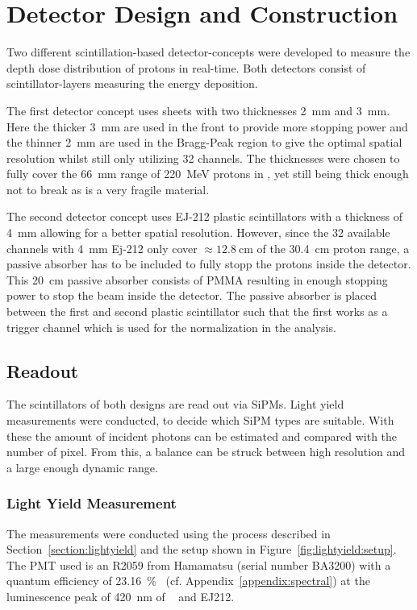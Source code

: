 \chapter{Detector Design and Construction}\label{chapter:setup}
Two different scintillation-based detector-concepts were developed to measure the depth dose distribution of protons in real-time.
Both detectors consist of scintillator-layers measuring the energy deposition.

The first detector concept uses  sheets with two thicknesses \SI{2}{\mm} and \SI{3}{\mm}.
Here the thicker \SI{3}{\mm} are used in the front to provide more stopping power and the thinner \SI{2}{\mm} are used in the Bragg-Peak region to give the optimal spatial resolution whilst still only utilizing 32 channels.
The thicknesses were chosen to fully cover the \SI{66}{\mm} range of \SI{220}{\mega\electronvolt} protons in , yet still being thick enough not to break as  is a very fragile material.

The second detector concept uses EJ-212 plastic scintillators with a thickness of \SI{4}{\mm} allowing for a better spatial resolution.
However, since the 32 available channels with \SI{4}{\mm} Ej-212 only cover $\approx \SI{12.8}{\centi\meter}$ of the \SI{30.4}{\centi\meter} proton range, a passive absorber has to be included to fully stopp the protons inside the detector.
This \SI{20}{\centi\meter} passive absorber consists of PMMA resulting in enough stopping power to stop the beam inside the detector.
The passive absorber is placed between the first and second plastic scintillator such that the first works as a trigger channel which is used for the normalization in the analysis.

\section{Readout}\label{section:readout}
The scintillators of both designs are read out via SiPMs.
Light yield measurements were conducted, to decide which SiPM types are suitable.
With these the amount of incident photons can be estimated and compared with the number of pixel.
From this, a balance can be struck between high resolution and a large enough dynamic range.
 
\subsection{Light Yield Measurement}
The measurements were conducted using the process described in Section~\ref{section:lightyield} and the setup shown in Figure~\ref{fig:lightyield:setup}.
The PMT used is an R2059 from Hamamatsu (serial number BA3200) with a quantum efficiency of \SI{23.16}{\percent}~\cite{datasheet:hamamatsu_R2059} (cf. Appendix~\ref{appendix:spectral}) at the luminescence peak of \SI{420}{\nano\meter} of ~\cite{cms:tdr} and EJ212.

